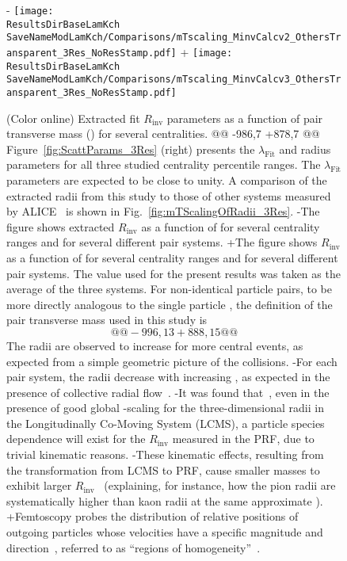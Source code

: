 \begin{table}[htbp]
 \begin{figure}[h]
   \centering
-  \texttt{[image: \\ResultsDirBaseLamKch\\SaveNameModLamKch/Comparisons/mTscaling\_MinvCalcv2\_OthersTransparent\_3Res\_NoResStamp.pdf]}
+  \texttt{[image: \\ResultsDirBaseLamKch\\SaveNameModLamKch/Comparisons/mTscaling\_MinvCalcv3\_OthersTransparent\_3Res\_NoResStamp.pdf]}
   \caption[\mt Scaling of Radii: 3 Residuals in Fit]
   {
   (Color online) Extracted fit $R_{\mathrm{inv}}$ parameters as a function of pair transverse mass (\mt) for several centralities.
@@ -986,7 +878,7 @@
 Figure~\ref{fig:ScattParams_3Res} (right) presents the $\lambda_{\mathrm{Fit}}$ and radius parameters for all three studied centrality percentile ranges.
 The $\lambda_{\mathrm{Fit}}$ parameters are expected to be close to unity. 
 A comparison of the extracted radii from this study to those of other systems measured by ALICE~\cite{Adam:2015vja} is shown in Fig.~\ref{fig:mTScalingOfRadii_3Res}. 
-The figure shows extracted $R_{\mathrm{inv}}$ as a function of \mt for several centrality ranges and for several different pair systems.
+The figure shows $R_{\mathrm{inv}}$ as a function of \mt for several centrality ranges and for several different pair systems.
 The \mt value used for the present \LamK results was taken as the average of the three systems.
 For non-identical particle pairs, to be more directly analogous to the single particle \mt, the definition of the pair transverse mass used in this study is
 \begin{equation}
@@ -996,13 +888,15 @@
 \label{eqn:PairmTv1}
 \end{equation}
 The radii are observed to increase for more central events, as expected from a simple geometric picture of the collisions.
-For each pair system, the radii decrease with increasing \mt, as expected in the presence of collective radial flow~\cite{Akkelin:1995gh}.
-It was found that~\cite{Kisiel:2014upa}, even in the presence of good global \mt-scaling for the three-dimensional radii in the Longitudinally Co-Moving System (LCMS), a particle species dependence will exist for the $R_{\mathrm{inv}}$ measured in the PRF, due to trivial kinematic reasons.
-These kinematic effects, resulting from the transformation from LCMS to PRF, cause smaller masses to exhibit larger $R_{\mathrm{inv}}$~\cite{Adam:2015vja} (explaining, for instance, how the pion radii are systematically higher than kaon radii at the same approximate \mt).
+Femtoscopy probes the distribution of relative positions of outgoing particles whose velocities have a specific magnitude and direction~\cite{Lisa:2005dd}, referred to as ``regions of homogeneity''~\cite{Akkelin:1995gh}.
}
\end{figure}
\end{table}
